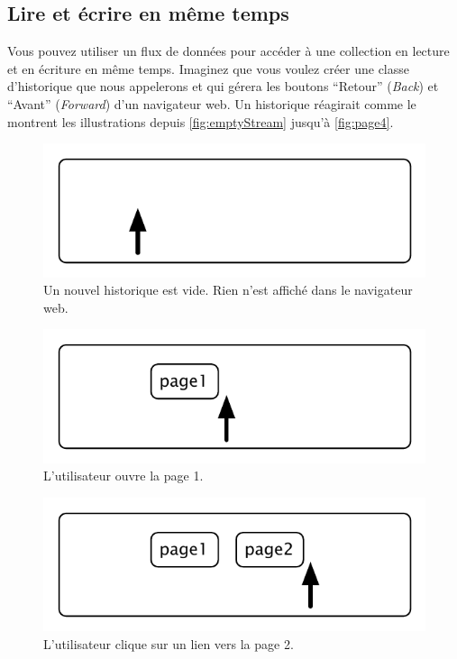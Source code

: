 \documentclass[a4paper,10pt,twoside]{book}
\begin{document}
\subsection{Lire et écrire en même temps}

Vous pouvez utiliser un flux de données pour accéder à une collection
en lecture et en écriture en même temps.
Imaginez que vous voulez créer une classe d'historique que nous appelerons  et qui gérera
les boutons ``Retour'' (\emph{Back}) et ``Avant'' (\emph{Forward}) d'un
navigateur web.
Un historique réagirait comme le montrent les illustrations depuis \ref{fig:emptyStream} jusqu'à \ref{fig:page4}.

\begin{figure}[!ht]
\centerline{\includegraphics[scale=0.5]{emptyStef}}
\caption{Un nouvel historique est vide. Rien n'est affiché dans le navigateur web.}
\vspace{.2in}
\end{figure}

\begin{figure}[!ht]
\centerline{\includegraphics[scale=0.5]{page1Stef}}
\caption{L'utilisateur ouvre la page 1.}
\vspace{.2in}
\end{figure}

\begin{figure}[!ht]
\centerline{\includegraphics[scale=0.5]{page2Stef}}
\caption{L'utilisateur clique sur un lien vers la page 2.}
\vspace{.2in}
\end{figure}
\end{document}
